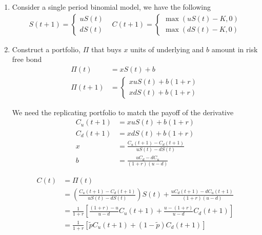 \documentclass[12pt,twoside]{article}
\begin{document}
\begin{enumerate}
	\item Consider a single period binomial model, we have the following
	\begin{align*}
		S(t+1) = \begin{cases}
		uS(t)\\
		dS(t)
		\end{cases}
		&
		C(t+1) = \begin{cases}
		\max\left(uS(t)-K, 0\right)\\
		\max\left(dS(t)-K, 0\right)
		\end{cases}
	\end{align*}

	\item Construct a portfolio, $\Pi$ that buys $x$ units of underlying and $b$ amount in risk free bond
	\begin{align*}
		\Pi(t) 		& = xS(t) + b\\
		\Pi(t+1)	& = \begin{cases}
		xuS(t) + b(1+r)\\
		xdS(t) + b(1+r)
		\end{cases}
	\end{align*}

	We need the replicating portfolio to match the payoff of the derivative
	\begin{align*}
		C_u(t+1) &= xuS(t) + b(1+r) \\
		C_d(t+1) &= xdS(t) + b(1+r)\\
		x & = \frac{C_u(t+1) - C_d(t+1)}{uS(t) - dS(t)}\\
		b &= \frac{uC_d - dC_u}{(1+r)(u-d)}
	\end{align*}		

	\begin{align*}
		C(t) 	&= \Pi(t)  \\
				& = \left(\frac{C_u(t+1) - C_d(t+1)}{uS(t) - dS(t)}\right)S(t) + \frac{uC_d(t+1) - dC_u(t+1)}{(1+r)(u-d)}\\
				& = \frac{1}{1+r}\left[\frac{(1+r)-u}{u-d} C_u(t+1) + \frac{u-(1+r)}{u-d} C_d(t+1)\right]\\
				& = \frac{1}{1+r}\left[\tilde{p} C_u(t+1) + (1-\tilde{p}) C_d(t+1)\right]\\
	\end{align*}

\end{enumerate}
\end{document}
